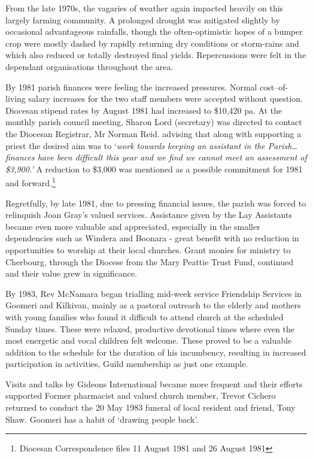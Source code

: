 From the late 1970s, the vagaries of weather again impacted heavily on
this largely farming community. A prolonged drought was mitigated
slightly by occasional advantageous rainfalls, though the
often-optimistic hopes of a bumper crop were mostly dashed by rapidly
returning dry conditions or storm-rains and which also reduced or
totally destroyed final yields. Repercussions were felt in the dependant
organisations throughout the area.

By 1981 parish finances were feeling the increased pressures. Normal
cost--of-living salary increases for the two staff members were accepted
without question. Diocesan stipend rates by August 1981 had increased to
\$10,420 pa. At the monthly parish council meeting, Sharon Lord
(secretary) was directed to contact the Diocesan Registrar, Mr Norman
Reid. advising that along with supporting a priest the desired aim was
to `\emph{work towards keeping an assistant in the Parish\ldots finances
have been difficult this year and we find we cannot meet an assessment
of \$3,900.'} A reduction to \$3,000 was mentioned as a possible
commitment for 1981 and forward.\footnote{Diocesan Correspondence files
  11 August 1981 and 26 August 1981}

Regretfully, by late 1981, due to pressing financial issues, the parish
was forced to relinquish Joan Gray's valued services. Assistance given
by the Lay Assistants became even more valuable and appreciated,
especially in the smaller dependencies such as Windera and Boonara -
great benefit with no reduction in opportunities to worship at their
local churches. Grant monies for ministry to Cherbourg, through the
Diocese from the Mary Peattie Trust Fund, continued and their value grew
in significance.

By 1983, Rev McNamara began trialling mid-week service Friendship
Services in Goomeri and Kilkivan, mainly as a pastoral outreach to the
elderly and mothers with young families who found it difficult to attend
church at the scheduled Sunday times. These were relaxed, productive
devotional times where even the most energetic and vocal children felt
welcome. These proved to be a valuable addition to the schedule for the
duration of his incumbency, resulting in increased participation in
activities, Guild membership as just one example.

Visits and talks by Gideons International became more frequent and their
efforts supported Former pharmacist and valued church member, Trevor
Cichero returned to conduct the 20 May 1983 funeral of local resident
and friend, Tony Shaw. Goomeri has a habit of `drawing people back'.

